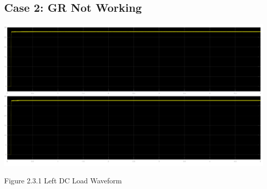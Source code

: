 \documentclass{mcmthesis}
\begin{document}
\subsection{Case 2: GR Not Working}
\begin{center}
\includegraphics[trim= 0 0.28\imageheight{} 0 0, clip, width = 0.165\imageheight{}]{gr_down_load1.png}
\end{center}
\begin{center}
\small{Figure 2.3.1 Left DC Load Waveform}
\end{center}
\end{document}
